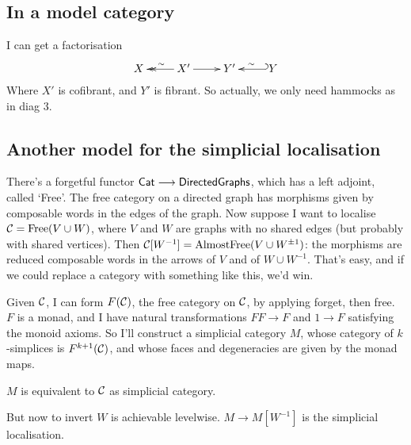 \begin{SaulSimplicialLocalisation}
\subsection*{In a model category}
I can get a factorisation
\[\xymatrix{
X&\ar@{->>}[l]_\sim X'\ar[r]&Y'\ar@{_{(}->}[r];[]_\sim&Y
}\]
Where $X'$ is cofibrant, and $Y'$ is fibrant. So actually, we only need hammocks as in diag 3.
\subsection*{Another model for the simplicial localisation}
There's a forgetful functor $\operatorname{{\mathsf{Cat}}}\longrightarrow\mathsf{DirectedGraphs}$, which has a left adjoint, called `Free'. The free category on a directed graph has morphisms given by composable words in the edges of the graph. Now suppose I want to localise $\mathcal{C}=\text{Free}(V\cup W)$, where $V$ and $W$ are graphs with no shared edges (but probably with shared vertices). Then $\mathcal{C}[W^{-1}]=\text{AlmostFree}(V\cup W^{\pm1})$:  the morphisms are reduced composable words in the arrows of $V$ and of $W\cup W^{-1}$. That's easy, and if we could replace a category with something like this, we'd win.

Given $\mathcal{C}$, I can form $F(\mathcal{C})$, the free category on $\mathcal{C}$, by applying forget, then free. $F$ is a monad, and I have natural transformations $FF\to F$ and $1\to F$ satisfying the monoid axioms. So I'll construct a simplicial category $M$, whose category of $k$-simplices is $F^{k+1}(\mathcal{C})$, and whose faces and degeneracies are given by the monad maps.

\begin{fact}
$M$ is equivalent to $\mathcal{C}$ as  simplicial category.
\end{fact}
\noindent But now to invert $W$ is achievable levelwise. $M\to M[W^{-1}]$ is the simplicial localisation.

\end{SaulSimplicialLocalisation}
